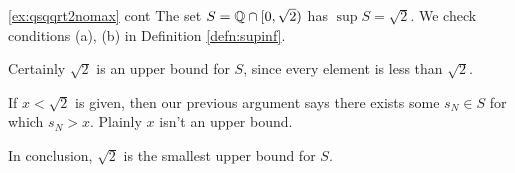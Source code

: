 % 
% 
% 
% 

\goodbreak

\begin{example*}{\ref{ex:qsqqrt2nomax} cont}{}
	The set $S=\mathbb{Q}\cap[0,\sqrt 2)$ has $\sup S=\sqrt 2$. We check conditions (a), (b) in Definition \ref{defn:supinf}.
	\begin{enumeratea}
		\item Certainly $\sqrt 2$ is an upper bound for $S$, since every element is less than $\sqrt 2$.
		\item If $x<\sqrt 2$ is given, then our previous argument says there exists some $s_N\in S$ for which $s_N>x$. Plainly $x$ isn't an upper bound.
	\end{enumeratea}
	In conclusion, $\sqrt 2$ is the smallest upper bound for $S$.
\end{example*}

